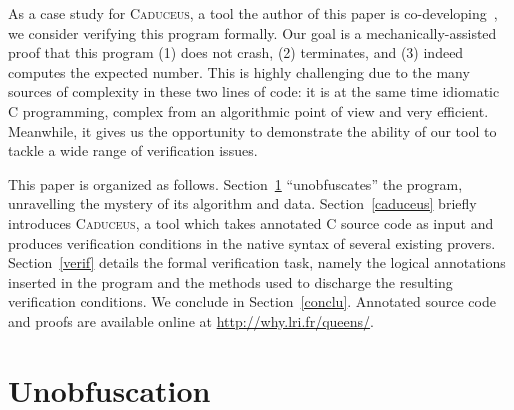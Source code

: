 \documentclass[a4paper]{llncs}
\newcommand{\caduceus}{\textsc{Caduceus}}
\begin{document}
As a case study for \caduceus, a tool the author of this paper is
co-develo\-ping~\cite{caduceus}, we consider
verifying this program formally. Our goal is a
mechanically-assisted proof that this program (1) does not crash, 
(2) terminates, and (3) indeed computes the expected number. 
This is highly challenging due to the many sources of complexity in
these two lines of code: it is at the same time
idiomatic C programming, complex from an algorithmic point of view and
very efficient. Meanwhile, it gives us the opportunity to demonstrate
the ability of our tool to tackle a wide range of verification issues.

This paper is organized as follows. Section~\ref{unobf}
``unobfuscates'' the program, unravelling the mystery of its algorithm
and data. Section~\ref{caduceus} briefly introduces \caduceus, a
tool which takes annotated C source code as input and produces
verification conditions in the native syntax of several existing provers.
Section~\ref{verif} details the formal verification task, namely
the logical annotations inserted in the program and the methods used
to discharge the resulting verification conditions.  We conclude in
Section~\ref{conclu}. Annotated source code and proofs are available
online at \url{http://why.lri.fr/queens/}.


\section{Unobfuscation}\label{unobf}
\end{document}

